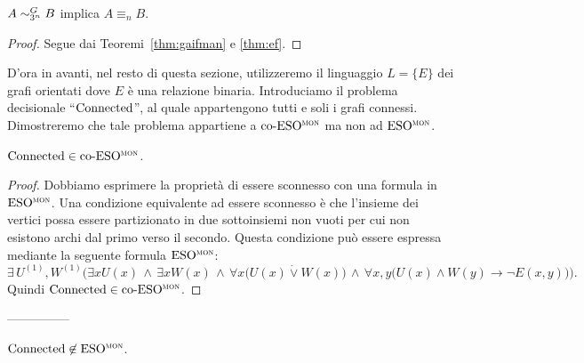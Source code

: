 \begin{corollario}
  $A \sim^{G}_{3^n} B$ implica $A \equiv_n B$.
\end{corollario}

\begin{proof}
  Segue dai Teoremi~\ref{thm:gaifman} e \ref{thm:ef}.
\end{proof}



D'ora in avanti, nel resto di questa sezione, utilizzeremo il linguaggio $L=\{E\}$ dei grafi orientati dove $E$ è una relazione binaria.
Introduciamo il problema decisionale ``$\operatorname{Connected}$'', al quale appartengono tutti e soli i grafi connessi.
Dimostreremo che tale problema appartiene a $\operatorname{co-ESO^{\normalfont\textsc{mon}}}$ ma non ad $\operatorname{ESO^{\normalfont\textsc{mon}}}$.

\begin{lemma}
  $\operatorname{Connected} \in \operatorname{co-ESO^{\normalfont\textsc{mon}}}$.
\end{lemma}

\begin{proof}
  Dobbiamo esprimere la proprietà di essere sconnesso con una formula in $\operatorname{ESO^{\normalfont\textsc{mon}}}$.
  Una condizione equivalente ad essere sconnesso è che l'insieme dei vertici possa essere partizionato in due sottoinsiemi non vuoti per cui non esistono archi dal primo verso il secondo. Questa condizione può essere espressa mediante la seguente formula $\operatorname{ESO^{\normalfont\textsc{mon}}}$:
  \[ \exists \, U^{(1)}, W^{(1)} \Big( \exists x U(x) \,\wedge\, \exists x W(x) \,\wedge\, \forall x \big( U(x) \dot\lor W(x) \big) \,\wedge\, \forall x,y \big( U(x)\wedge W(y) \rightarrow \lnot E(x,y)\big) \Big). \]
  Quindi $\operatorname{Connected} \in \operatorname{co-ESO^{\normalfont\textsc{mon}}}$.
\end{proof}


---------------




\begin{lemma}
  $\operatorname{Connected} \not\in \operatorname{ESO^{\normalfont\textsc{mon}}}$.
\end{lemma}

